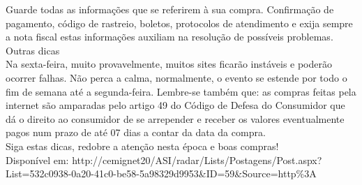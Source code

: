 \documentclass[]{article}
\begin{document}
Guarde todas as informações que se referirem à sua compra. Confirmação de pagamento, código de rastreio, boletos, protocolos de atendimento e exija sempre a nota fiscal estas informações auxiliam na resolução de possíveis problemas.\\
\newline
Outras dicas\\
\newline
Na sexta-feira, muito provavelmente, muitos sites ficarão instáveis e poderão ocorrer  falhas. Não perca a calma, normalmente, o evento se estende por todo o fim de semana até a segunda-feira.
Lembre-se também que: as compras feitas pela internet são amparadas pelo artigo 49 do Código de Defesa do Consumidor que dá o direito ao consumidor de se arrepender e receber os valores eventualmente pagos num prazo de até 07 dias a contar da data da compra.\\
\newline
Siga estas dicas, redobre a atenção nesta época e boas compras!\\
\newline
Disponível em: http://cemignet20/ASI/radar/Lists/Postagens/Post.aspx?List=532c0938-0a20-41c0-be58-5a98329d9953&ID=59&Source=http\%3A%
\end{document}
